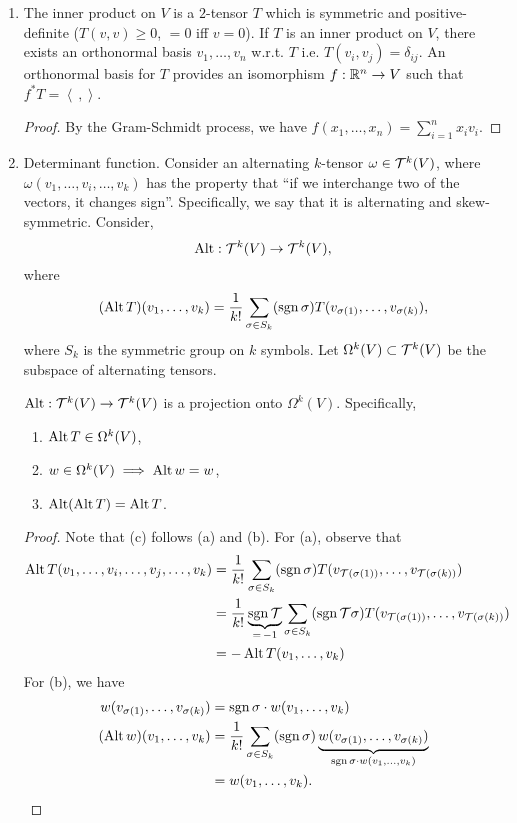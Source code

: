 \begin{enumerate}[label=(\roman*)]
    \item The inner product on $V$ is a $2$-tensor $T$ which is symmetric and positive-definite ($T(v, v) \geq 0$, $= 0$ iff $v = 0$). If $T$ is an inner product on $V$, there exists an orthonormal basis $v_1, \dots, v_n$ w.r.t. $T$ i.e. $T(v_i, v_j) = \delta_{ij}$. An orthonormal basis for $T$ provides an isomorphism $f : \mathbb R^n \to V$ such that $f^\ast T = \left< \, , \right>$.
    \begin{proof}
        By the Gram-Schmidt process, we have $f(x_1, \dots, x_n) = \sum_{i=1}^n x_i v_i$.
    \end{proof}
    \item Determinant function. Consider an alternating $k$-tensor $\omega \in \mathcal T^k(V)$, where $\omega(v_1, \dots, v_i, \dots, v_k)$ has the property that ``if we interchange two of the vectors, it changes sign''. Specifically, we say that it is alternating and skew-symmetric. Consider,
    \[ \operatorname{Alt} : \mathcal T^k(V) \to \mathcal T^k(V), \]
    where
    \[ (\operatorname{Alt} T)(v_1, \dots, v_k) = \frac{1}{k!} \sum_{\sigma \in S_k} (\operatorname{sgn} \sigma) T(v_{\sigma(1)}, \dots, v_{\sigma(k)}), \]
    where $S_k$ is the symmetric group on $k$ symbols. Let $\Omega^k(V) \subset \mathcal T^k(V)$ be the subspace of alternating tensors.
    \begin{simplethm}[Spivak 4-3]
        $\operatorname{Alt} : \mathcal T^k(V) \to \mathcal T^k(V)$ is a projection onto $\Omega^k(V)$. Specifically,
        \begin{enumerate}[label=(\alph*)]
            \item $\operatorname{Alt} T \in \Omega^k(V)$,
            \item $w \in \Omega^k(V) \implies \operatorname{Alt} w = w$,
            \item $\operatorname{Alt}(\operatorname{Alt} T) = \operatorname{Alt} T$.
        \end{enumerate}
    \end{simplethm}
    \begin{proof}
        Note that (c) follows (a) and (b). For (a), observe that
        \begin{align*}
            \operatorname{Alt} T(v_1, \dots, v_i, \dots, v_j, \dots, v_k) &= \frac{1}{k!} \sum_{\sigma \in S_k} (\operatorname{sgn} \sigma) T(v_{\mathcal T(\sigma(1))}, \dots, v_{\mathcal T(\sigma(k))}) \\
            &= \frac{1}{k!} \underbrace{\operatorname{sgn} \mathcal T}_{= \, -1} \sum_{\sigma \in S_k} (\operatorname{sgn} \mathcal T \sigma) T(v_{\mathcal T(\sigma(1))}, \dots, v_{\mathcal T(\sigma(k))}) \\
            &= - \operatorname{Alt} T(v_1, \dots, v_k)
        \end{align*}
        For (b), we have
        \begin{align*}
            w(v_{\sigma(1)}, \dots, v_{\sigma(k)}) &= \operatorname{sgn} \sigma \cdot w(v_1, \dots, v_k) \\
            (\operatorname{Alt} w)(v_1, \dots, v_k) &= \frac{1}{k!} \sum_{\sigma \in S_k} (\operatorname{sgn} \sigma) \underbrace{w(v_{\sigma(1)}, \dots, v_{\sigma(k)})}_{\operatorname{sgn} \sigma \cdot w(v_1, \dots, v_k)} \\
            &= w(v_1, \dots, v_k). \qedhere
        \end{align*}
    \end{proof}
\end{enumerate}